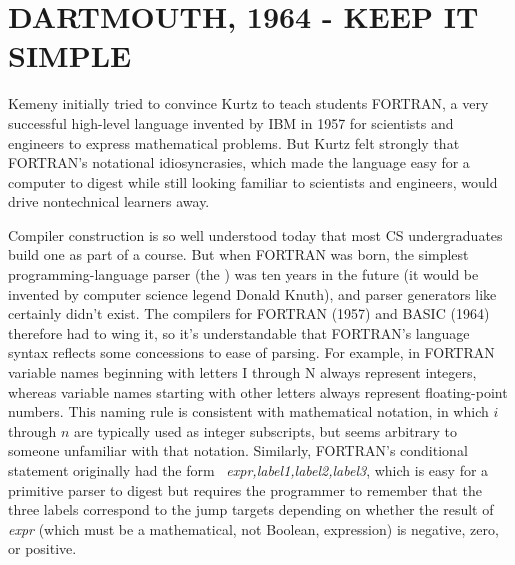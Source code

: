 
\section{DARTMOUTH, 1964 - KEEP IT SIMPLE}


Kemeny initially tried to convince Kurtz to teach students FORTRAN, a
very successful high-level language invented by IBM in 1957 for
scientists and engineers to express mathematical problems.
But Kurtz felt strongly that FORTRAN's notational idiosyncrasies, which made
the language easy for a computer to digest while still looking familiar to scientists
and engineers, would drive
nontechnical learners away.

\begin{tangent} 
Compiler construction is so well understood today that most CS
undergraduates build one as part of a course.
But when FORTRAN was born, the simplest programming-language
parser (the 
) was ten years in the
future (it would be invented by computer science legend Donald Knuth),
and parser generators like  certainly didn't exist.  The
compilers for FORTRAN (1957) and BASIC (1964) therefore had to wing it,
so it's understandable that FORTRAN's language syntax
reflects some concessions to ease of parsing.
For example, in FORTRAN
variable names beginning with letters I through N always represent
integers, whereas variable names starting with other letters always
represent floating-point numbers.
This naming rule is consistent with mathematical notation, in which
$i$ through $n$ are typically used as integer subscripts, but seems
arbitrary to someone unfamiliar with that notation.
Similarly, FORTRAN's conditional statement originally had the form
~\emph{expr,label1,label2,label3}, which is easy
for a primitive parser to digest
but requires the programmer to remember that the three labels 
correspond to the jump targets depending on whether the result of
\emph{expr} (which must be a mathematical, not Boolean, expression) is negative, zero, or positive.  

\end{tangent}

